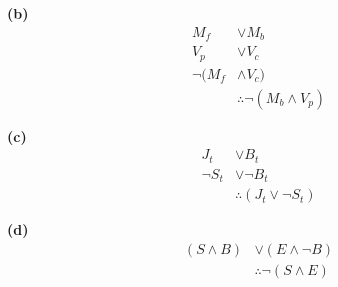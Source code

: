 \sol \textbf{(b)} 
    \begin{align*}
        M_f &\lor M_b\\
        V_p &\lor V_c\\ 
        \neg (M_f &\land V_c)\\
        &\therefore \neg (M_b \land V_p) 
    \end{align*}
  
\sol \textbf{(c)}
    \begin{align*}
        J_t &\lor B_t\\
        \neg S_t &\lor \neg B_t\\ 
             &\therefore (J_t \lor \neg S_t)
    \end{align*}
  
\sol \textbf{(d)}
    \begin{align*}
        (S \land B) &\lor (E \land \neg B)\\
                    &\therefore \neg (S \land E)
    \end{align*}
  






